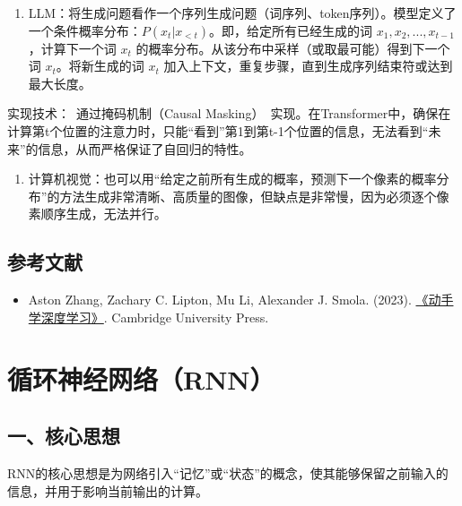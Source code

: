 \begin{enumerate}
\def\labelenumi{\arabic{enumi}.}
\tightlist
\item
  LLM：将生成问题看作一个序列生成问题（词序列、token序列）。模型定义了一个条件概率分布：\(P(x_t | x_{<t})\)。即，给定所有已经生成的词 \(x_1, x_2, ..., x_{t-1}\)，计算下一个词 \(x_t\) 的概率分布。从该分布中采样（或取最可能）得到下一个词 \(x_t\)。将新生成的词 \(x_t\) 加入上下文，重复步骤，直到生成序列结束符或达到最大长度。
\end{enumerate}

实现技术：~通过掩码机制（Causal Masking）~实现。在Transformer中，确保在计算第t个位置的注意力时，只能``看到''第1到第t-1个位置的信息，无法看到``未来''的信息，从而严格保证了自回归的特性。

\begin{enumerate}
\def\labelenumi{\arabic{enumi}.}
\setcounter{enumi}{1}
\tightlist
\item
  计算机视觉：也可以用``给定之前所有生成的概率，预测下一个像素的概率分布''的方法生成非常清晰、高质量的图像，但缺点是非常慢，因为必须逐个像素顺序生成，无法并行。
\end{enumerate}

\hypertarget{ux53c2ux8003ux6587ux732e-15}{%
\subsection{参考文献}\label{ux53c2ux8003ux6587ux732e-15}}

\begin{itemize}
\tightlist
\item
  Aston Zhang, Zachary C. Lipton, Mu Li, Alexander J. Smola. (2023). \href{https://zh.d2l.ai/}{《动手学深度学习》}. Cambridge University Press.
\end{itemize}

\clearpage

\hypertarget{ux5faaux73afux795eux7ecfux7f51ux7edcrnn}{%
\section{循环神经网络（RNN）}\label{ux5faaux73afux795eux7ecfux7f51ux7edcrnn}}

\hypertarget{ux4e00ux6838ux5fc3ux601dux60f3-1}{%
\subsection{一、核心思想}\label{ux4e00ux6838ux5fc3ux601dux60f3-1}}

RNN的核心思想是为网络引入``记忆''或``状态''的概念，使其能够保留之前输入的信息，并用于影响当前输出的计算。

